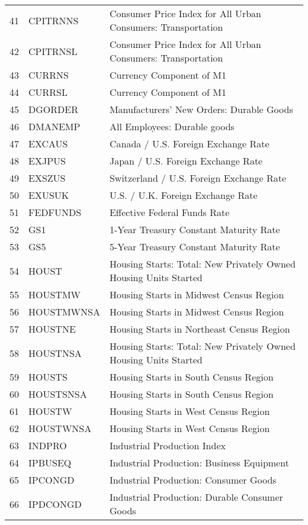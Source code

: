 \begin{table}[ht]
\begin{tabular}{rll}
  41 & CPITRNNS & Consumer Price Index for All Urban Consumers: Transportation \\ 
  42 & CPITRNSL & Consumer Price Index for All Urban Consumers: Transportation \\ 
  43 & CURRNS & Currency Component of M1 \\ 
  44 & CURRSL & Currency Component of M1 \\ 
  45 & DGORDER & Manufacturers' New Orders: Durable Goods \\ 
  46 & DMANEMP & All Employees: Durable goods \\ 
  47 & EXCAUS & Canada / U.S. Foreign Exchange Rate \\ 
  48 & EXJPUS & Japan / U.S. Foreign Exchange Rate \\ 
  49 & EXSZUS & Switzerland / U.S. Foreign Exchange Rate \\ 
  50 & EXUSUK & U.S. / U.K. Foreign Exchange Rate \\ 
  51 & FEDFUNDS & Effective Federal Funds Rate \\ 
  52 & GS1 & 1-Year Treasury Constant Maturity Rate \\ 
  53 & GS5 & 5-Year Treasury Constant Maturity Rate \\ 
  54 & HOUST & Housing Starts: Total: New Privately Owned Housing Units Started \\ 
  55 & HOUSTMW & Housing Starts in Midwest Census Region \\ 
  56 & HOUSTMWNSA & Housing Starts in Midwest Census Region \\ 
  57 & HOUSTNE & Housing Starts in Northeast Census Region \\ 
  58 & HOUSTNSA & Housing Starts: Total: New Privately Owned Housing Units Started \\ 
  59 & HOUSTS & Housing Starts in South Census Region \\ 
  60 & HOUSTSNSA & Housing Starts in South Census Region \\ 
  61 & HOUSTW & Housing Starts in West Census Region \\ 
  62 & HOUSTWNSA & Housing Starts in West Census Region \\ 
  63 & INDPRO & Industrial Production Index \\ 
  64 & IPBUSEQ & Industrial Production: Business Equipment \\ 
  65 & IPCONGD & Industrial Production: Consumer Goods \\ 
  66 & IPDCONGD & Industrial Production: Durable Consumer Goods \\ 

\end{tabular}
\end{table}
